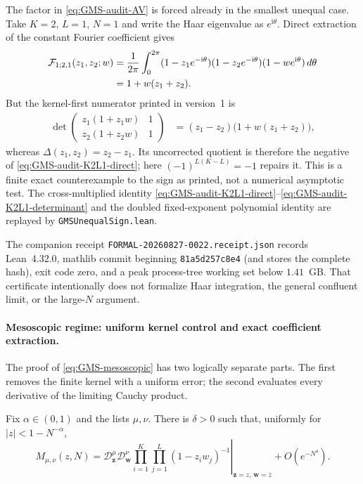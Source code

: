 The factor in \eqref{eq:GMS-audit-AV} is forced already in the smallest unequal case.  Take
$K=2$, $L=1$, $N=1$ and write the Haar eigenvalue as $e^{\mathrm i\theta}$.  Direct extraction
of the constant Fourier coefficient gives
\begin{align}
 \mathcal F_{1;2,1}(z_1,z_2;w)
 &=\frac1{2\pi}\int_0^{2\pi}
 (1-z_1e^{-\mathrm i\theta})(1-z_2e^{-\mathrm i\theta})
 (1-we^{\mathrm i\theta})\,d\theta\notag\\
 &=1+w(z_1+z_2).
 \label{eq:GMS-audit-K2L1-direct}
\end{align}
But the kernel-first numerator printed in version~1 is
\begin{align}
 \det\begin{pmatrix}
 z_1(1+z_1w)&1\\ z_2(1+z_2w)&1
 \end{pmatrix}
 &=(z_1-z_2)\bigl(1+w(z_1+z_2)\bigr),
 \label{eq:GMS-audit-K2L1-determinant}
\end{align}
whereas $\Delta(z_1,z_2)=z_2-z_1$.  Its uncorrected quotient is therefore the negative of
\eqref{eq:GMS-audit-K2L1-direct}; here $(-1)^{L(K-L)}=-1$ repairs it.  This is a finite exact
counterexample to the sign as printed, not a numerical asymptotic test.
The cross-multiplied identity
\eqref{eq:GMS-audit-K2L1-direct}--\eqref{eq:GMS-audit-K2L1-determinant} and the doubled
fixed-exponent polynomial identity are replayed by \texttt{GMSUnequalSign.lean}.

The companion receipt \texttt{FORMAL-20260827-0022.receipt.json} records Lean~4.32.0,
mathlib commit beginning
\texttt{81a5d257c8e4} (and stores the complete hash), exit code zero, and a peak process-tree
working set below $1.41$~GB.  That certificate intentionally does not formalize Haar
integration, the general confluent limit, or the large-\(N\) argument.

\paragraph{Mesoscopic regime: uniform kernel control and exact coefficient extraction.}
The proof of \eqref{eq:GMS-mesoscopic} has two logically separate parts.  The first removes
the finite kernel with a uniform error; the second evaluates every derivative of the limiting
Cauchy product.

\begin{lemma}
\label{lem:GMS-audit-uniform-product}
Fix $\alpha\in(0,1)$ and the lists $\mu,\nu$.  There is
$\delta>0$ such that, uniformly for $|z|<1-N^{-\alpha}$,
\begin{equation}
 M_{\mu,\nu}(z,N)
 =\left.
 \mathcal D_{\mathbf z}^{\mu}\mathcal D_{\mathbf w}^{\nu}
 \prod_{i=1}^{K}\prod_{j=1}^{L}(1-z_iw_j)^{-1}
 \right|_{\mathbf z=z,\,\mathbf w=\overline z}
 +O(e^{-N^\delta}).
 \label{eq:GMS-audit-uniform-product}
\end{equation}
\end{lemma}

